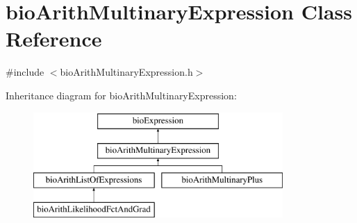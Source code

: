 \hypertarget{classbio_arith_multinary_expression}{}\section{bio\+Arith\+Multinary\+Expression Class Reference}
\label{classbio_arith_multinary_expression}


{\ttfamily \#include $<$bio\+Arith\+Multinary\+Expression.\+h$>$}

Inheritance diagram for bio\+Arith\+Multinary\+Expression\+:\begin{figure}[H]
\begin{center}
\leavevmode
\includegraphics[height=4.000000cm]{classbio_arith_multinary_expression}
\end{center}
\end{figure}
